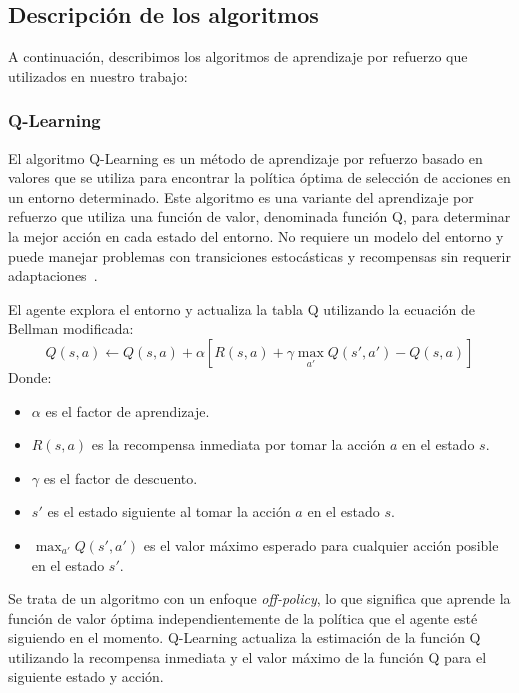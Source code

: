 \documentclass[conference,a4paper]{IEEEtran}
\begin{document}
\subsection{Descripción de los algoritmos}

A continuación, describimos los algoritmos de aprendizaje por refuerzo que utilizados en nuestro trabajo:\newline

\subsubsection{\textbf{Q-Learning}}
El algoritmo Q-Learning es un método de aprendizaje por refuerzo basado en valores que se utiliza para encontrar la política óptima de selección de acciones en un entorno determinado.
Este algoritmo es una variante del aprendizaje por refuerzo que utiliza una función de valor, denominada función Q, para determinar la mejor acción en cada estado del entorno.
No requiere un modelo del entorno y puede manejar problemas con transiciones estocásticas y recompensas sin requerir adaptaciones~\cite{b5}.

El agente explora el entorno y actualiza la tabla Q utilizando la ecuación de Bellman modificada:
\[
Q(s, a) \leftarrow Q(s, a) + \alpha [R(s, a) + \gamma \max_{a'} Q(s', a') - Q(s,a)]
\]
Donde:
\begin{itemize}
    \item \(\alpha\) es el factor de aprendizaje.
    \item \(R(s, a)\) es la recompensa inmediata por tomar la acción \(a\) en el estado \(s\).
    \item \(\gamma\) es el factor de descuento.
    \item \(s'\) es el estado siguiente al tomar la acción \(a\) en el estado \(s\).
    \item \(\max_{a'} Q(s', a')\) es el valor máximo esperado para cualquier acción posible en el estado \(s'\).\newline
\end{itemize}

Se trata de un algoritmo con un enfoque \textit{off-policy}, lo que significa que aprende la función de valor óptima independientemente de la política que el agente esté siguiendo en el momento. Q-Learning actualiza la estimación de la función Q utilizando la recompensa inmediata y el valor máximo de la función Q para el siguiente estado y acción.\newline
\end{document}
